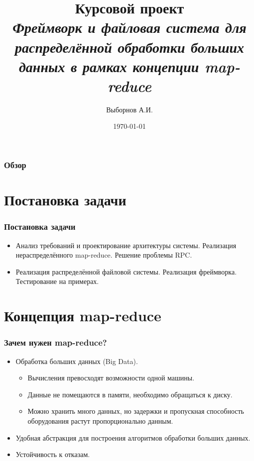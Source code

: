\documentclass{beamer}
\title[Distributed map-reduce]{Курсовой проект \\ \it{Фреймворк и файловая система для распределённой обработки больших данных в рамках концепции map-reduce}}
\author{Выборнов А.И.} %
\institute[МГТУ ИУ-9] {
    МГТУ~им.~Н.~Э.~Баумана \\
    \medskip
    \text{art-vybor@ya.com}
}
\date{\today}
\begin{document}
\begin{frame}
    \titlepage
\end{frame}


\begin{frame}
\frametitle{Обзор} 
\tableofcontents 
\end{frame}


\section{Постановка задачи}
    \begin{frame}
    \frametitle{Постановка задачи}
        \begin{itemize}
            \item Анализ требований и проектирование архитектуры системы. Реализация нераспределённого map-reduce. Решение проблемы RPC.
            \item Реализация распределённой файловой системы. Реализация фреймворка. Тестирование на примерах.
            
        \end{itemize} 
    \end{frame}

\section{Концепция map-reduce}
    \begin{frame}
    \frametitle{Зачем нужен map-reduce?}
        \begin{itemize}
            \item Обработка больших данных (Big Data).
            \begin{itemize}
                \item Вычисления превосходят возможности одной машины.  
                \item Данные не помещаются в памяти, необходимо обращаться к диску.
                \item Можно хранить много данных, но задержки и пропускная способность оборудования растут пропорционально данным.
            \end{itemize}
            \item Удобная абстракция для построения алгоритмов обработки больших данных.
            \item Устойчивость к отказам.            
        \end{itemize} 
    \end{frame}
\end{document}
